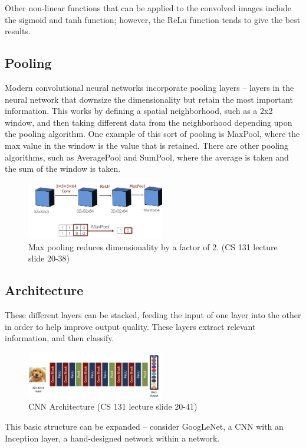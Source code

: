 \documentclass{article}
\begin{document}
Other non-linear functions that can be applied to the convolved images include the sigmoid and tanh function; however, the ReLu function tends to give the best results.

\subsection{Pooling}
Modern convolutional neural networks incorporate pooling layers -- layers in the neural network that downsize the dimensionality but retain the most important information. This works by defining a spatial neighborhood, such as a 2x2 window, and then taking different data from the neighborhood depending upon the pooling algorithm. One example of this sort of pooling is MaxPool, where the max value in the window is the value that is retained. There are other pooling algorithms, such as AveragePool and SumPool, where the average is taken and the sum of the window is taken.

\begin{figure}[h]
\includegraphics[width=6cm]{maxpooling.png}
\centering
\caption{Max pooling reduces dimensionality by a factor of 2. (CS 131 lecture slide 20-38)}
\end{figure}
 
\subsection{Architecture}
These different layers can be stacked, feeding the input of one layer into the other in order to help improve output quality. These layers extract relevant information, and then classify.

\begin{figure}[h]
\includegraphics[width=6cm]{structure.png}
\centering
\caption{CNN Architecture (CS 131 lecture slide 20-41)}
\end{figure}

This basic structure can be expanded -- consider GoogLeNet, a CNN with an Inception layer, a hand-designed network within a network. 
\end{document}
